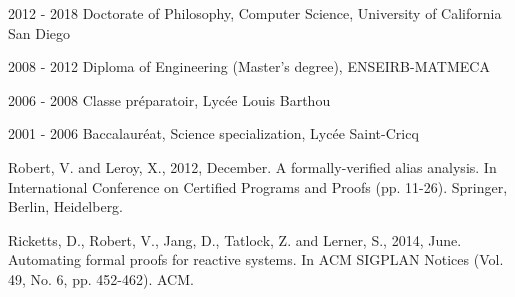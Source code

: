 \documentclass[12pt]{ucsddissertation}
\begin{document}
\begin{vita}
\noindent
\begin{cv}{}
\begin{cvlist}{}
\item[2012 - 2018] Doctorate of Philosophy, Computer Science, University of California San Diego
\item[2008 - 2012] Diploma of Engineering (Master's degree), ENSEIRB-MATMECA
\item[2006 - 2008] Classe pr\'eparatoir, Lyc\'ee Louis Barthou
\item[2001 - 2006] Baccalaur\'eat, Science specialization, Lyc\'ee Saint-Cricq
\end{cvlist}
\end{cv}

\publications

\noindent Robert, V. and Leroy, X., 2012, December. A formally-verified alias
analysis. In International Conference on Certified Programs and Proofs
(pp. 11-26). Springer, Berlin, Heidelberg.

\noindent Ricketts, D., Robert, V., Jang, D., Tatlock, Z. and Lerner, S., 2014,
June. Automating formal proofs for reactive systems. In ACM SIGPLAN Notices
(Vol. 49, No. 6, pp. 452-462). ACM.

\end{vita}
\end{document}
